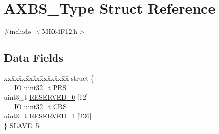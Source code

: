 \hypertarget{struct_a_x_b_s___type}{}\section{A\+X\+B\+S\+\_\+\+Type Struct Reference}
\label{struct_a_x_b_s___type}


{\ttfamily \#include $<$M\+K64\+F12.\+h$>$}

\subsection*{Data Fields}
\begin{DoxyCompactItemize}
\item 
\begin{tabbing}
xx\=xx\=xx\=xx\=xx\=xx\=xx\=xx\=xx\=\kill
struct \{\\
\>\mbox{\hyperlink{core__cm4_8h_aec43007d9998a0a0e01faede4133d6be}{\_\_IO}} uint32\_t \mbox{\hyperlink{group___v_r_e_f___peripheral___access___layer_ga8d30f22766bc0456616fa4f22e3620e1}{PRS}}\\
\>uint8\_t \mbox{\hyperlink{group___v_r_e_f___peripheral___access___layer_ga144e7a888c9f93089fd78220bc77af8b}{RESERVED\_0}} \mbox{[}12\mbox{]}\\
\>\mbox{\hyperlink{core__cm4_8h_aec43007d9998a0a0e01faede4133d6be}{\_\_IO}} uint32\_t \mbox{\hyperlink{group___v_r_e_f___peripheral___access___layer_ga95ba78b551cc36ed4649ad3693aa9978}{CRS}}\\
\>uint8\_t \mbox{\hyperlink{group___v_r_e_f___peripheral___access___layer_gabc2dc38106b6ab2d3320e9269cd05504}{RESERVED\_1}} \mbox{[}236\mbox{]}\\
\} \mbox{\hyperlink{group___v_r_e_f___peripheral___access___layer_ga289303c4d837180d3b16b684f80f0ba0}{SLAVE}} \mbox{[}5\mbox{]}\\


\end{tabbing}
\end{DoxyCompactItemize}
